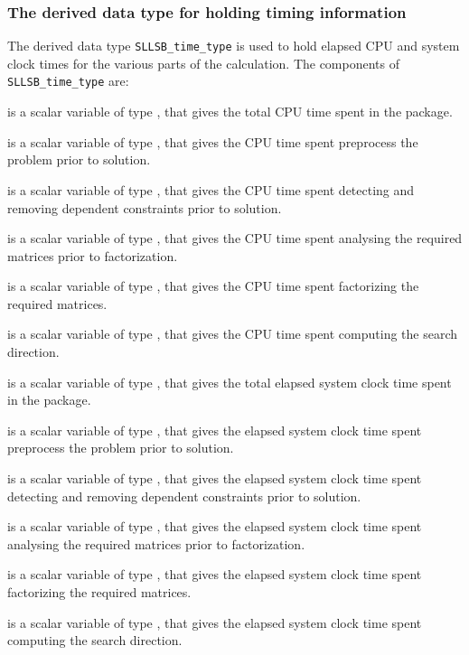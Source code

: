\documentclass{galahad}
\newcommand{\packagename}{SLLSB}
\begin{document}

\subsubsection{The derived data type for holding timing
 information}\label{typetime}
The derived data type
{\tt \packagename\_time\_type}
is used to hold elapsed CPU and system clock times for the various parts of
the calculation. The components of
{\tt \packagename\_time\_type}
are:
\begin{description}
 is a scalar variable of type \realdp, that gives
 the total CPU time spent in the package.

 is a scalar variable of type \realdp, that gives
 the CPU time spent preprocess the problem prior to solution.

 is a scalar variable of type \realdp, that gives
 the CPU time spent detecting and removing dependent constraints prior
to solution.

 is a scalar variable of type \realdp, that gives
 the CPU time spent analysing the required matrices prior to factorization.

 is a scalar variable of type \realdp, that gives
 the CPU time spent factorizing the required matrices.

 is a scalar variable of type \realdp, that gives
 the CPU time spent computing the search direction.

 is a scalar variable of type \realdp, that gives
 the total elapsed system clock time spent in the package.

 is a scalar variable of type \realdp, that gives
 the elapsed system clock time spent preprocess the problem prior to solution.

 is a scalar variable of type \realdp,
that gives  the elapsed system clock time spent detecting and removing
dependent constraints prior to solution.

 is a scalar variable of type \realdp, that gives
 the elapsed system clock time spent analysing the required matrices prior to
factorization.

 is a scalar variable of type \realdp, that gives
 the elapsed system clock time spent factorizing the required matrices.

 is a scalar variable of type \realdp, that gives
 the elapsed system clock time spent computing the search direction.

\end{description}
\end{document}

